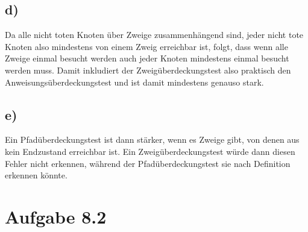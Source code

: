 \documentclass[a4paper,11pt]{scrartcl}
\begin{document}
	\subsection*{d)}
	    Da alle nicht toten Knoten über Zweige zusammenhängend sind, jeder nicht tote Knoten also mindestens von einem Zweig erreichbar ist, folgt, dass wenn alle Zweige einmal besucht werden auch jeder Knoten mindestens einmal besucht werden muss. Damit inkludiert der Zweigüberdeckungstest also praktisch den Anweisungsüberdeckungstest und ist damit mindestens genauso stark.
	\subsection*{e)}
	    Ein Pfadüberdeckungstest ist dann stärker, wenn es Zweige gibt, von denen aus kein Endzustand erreichbar ist. Ein Zweigüberdeckungstest würde dann diesen Fehler nicht erkennen, während der Pfadüberdeckungstest sie nach Definition erkennen könnte.

    \section*{Aufgabe 8.2}
\end{document}

